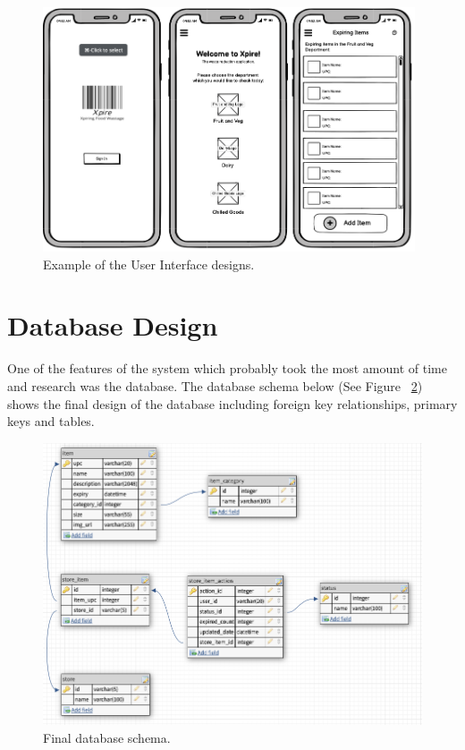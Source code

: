 \documentclass[a4paper,11pt]{report}
\begin{document}
\begin{figure}[H]
    \centering
    \includegraphics[width=11cm]{./assets/images/uiDesign-example.png}
    \caption{Example of the User Interface designs.}
    \label{fig:UIDesignExample}
\end{figure}

\section{Database Design}
One of the features of the system which probably took the most amount of time and research was the database.
The database schema below (See Figure ~\ref{fig:DBSchema}) shows the final design of the database including foreign key relationships, primary keys and tables.

\begin{figure}[H]
    \centering
    \includegraphics[width=12.5cm]{./assets/images/Database-Schema.png}
    \caption{Final database schema.}
    \label{fig:DBSchema}
\end{figure}
\end{document}
